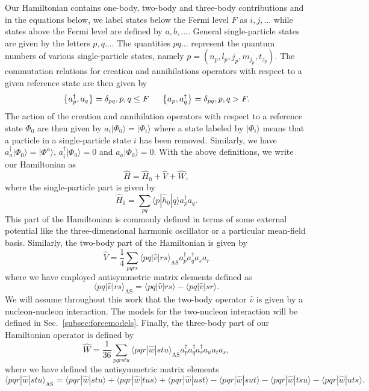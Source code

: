 \documentclass[aps,showpacs,floatfix,nofootinbib,preprintnumbers,superscriptaddress,amsmath,amssymb]{revtex4-1}
\begin{document}
Our Hamiltonian contains one-body, two-body and three-body contributions and in 
the equations below, we  label states below the Fermi level $F$ as $i,j,\ldots$ while states 
above the Fermi level are defined by $a,b,\ldots$. General single-particle states
are given by the letters  $p,q \dots$. The
quantities $pq\dots$ represent the quantum numbers of various
single-particle states, namely
$p=(n_p,l_p,j_p,m_{j_p},t_{z_p})$.   
The commutation relations for creation and annihilations operators with respect to
a given reference state are then given by
\[
   \left\{a_p^\dagger, a_q \right\}= \delta_{pq}, p, q \leq F \hspace{0.5cm} \left\{a_p, a_q^\dagger \right\} =
        \delta_{pq}, p, q > F.
\]
The action of the creation and annihilation operators with respect to a reference state $\Phi_0$ are then given by
 $a_i|\Phi_0\rangle = |\Phi_i\rangle$ where a state labeled by $|\Phi_i\rangle$ means that a particle in a 
single-particle state $i$ has been removed. Similarly, we have $a_a^\dagger|\Phi_0\rangle = |\Phi^a\rangle$, $a_i^\dagger|\Phi_0\rangle = 0$ 
and $a_a|\Phi_0\rangle = 0$.  With the above definitions, we write our Hamiltonian as
\[
\hat{H}=\hat{H}_0+\hat{V}+\hat{W},
\]
where 
the single-particle part is given by
 \[
    \hat{H}_0 = \sum_{pq} \langle p|\hat{h}_0|q\rangle a_p^\dagger a_q.
 \]
This part of the Hamiltonian is commonly defined in terms of some external potential like the three-dimensional 
harmonic oscillator or a particular mean-field basis. 
Similarly, the two-body part of the Hamiltonian
is given by  
\[
  \hat{V} = \frac{1}{4}\sum_{pqrs} \langle pq|\hat{v}|rs\rangle_{\mathrm{AS}} a_p^\dagger a_q^\dagger a_s a_r
\]
where we have employed antisymmetric matrix elements defined as
\[
\langle pq|\hat{v}|rs\rangle_{\mathrm{AS}}=\langle pq|\hat{v}|rs\rangle-\langle pq|\hat{v}|sr\rangle.
\]
We will assume throughout this work that the  two-body operator $\hat{v}$ is given by a nucleon-nucleon interaction.
The models for the two-nucleon interaction will be defined in Sec.~\ref{subsec:forcemodels}. 
Finally, the three-body part of our Hamiltonian operator  is defined by   
\[
   \hat{W} =\frac{1}{36} \sum_{pqrstu} \langle pqr|\hat{w}|stu\rangle_{\mathrm{AS}}a_p^\dagger a_q^\dagger a_r^\dagger a_u a_t a_s,
\]
where we have defined the antisymmetric matrix elements
\[
          \langle pqr|\hat{w}|stu\rangle_{\mathrm{AS}}= \langle pqr|\hat{w}|stu\rangle + \langle pqr|\hat{w}|tus\rangle + \langle pqr|\hat{w}|ust\rangle- \langle pqr|\hat{w}|sut\rangle - \langle pqr|\hat{w}|tsu\rangle - \langle pqr|\hat{w}|uts\rangle.
\]
\end{document}
